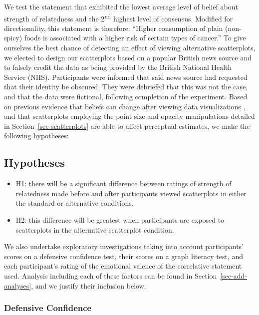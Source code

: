 \documentclass[sigconf]{acmart}
\providecommand{\tightlist}{%
  \setlength{\itemsep}{0pt}\setlength{\parskip}{0pt}}\usepackage{longtable,booktabs,array}
\begin{document}
We test the statement that exhibited the lowest average level of belief
about strength of relatedness and the 2\textsuperscript{nd} highest
level of consensus. Modified for directionality, this statement is
therefore: ``Higher consumption of plain (non-spicy) foods is associated
with a higher risk of certain types of cancer.'' To give ourselves the
best chance of detecting an effect of viewing alternative scatterplots,
we elected to design our scatterplots based on a popular British news
source and to falsely credit the data as being provided by the British
National Health Service (NHS). Participants were informed that said news
source had requested that their identity be obscured. They were
debriefed that this was not the case, and that the data were fictional,
following completion of the experiment. Based on previous evidence that
beliefs can change after viewing data visualizations
\citep{karduni_2020, markant_2023}, and that scatterplots employing the
point size and opacity manipulations detailed in
Section~\ref{sec-scatterplots} are able to affect perceptual estimates,
we make the following hypotheses:

\subsection{Hypotheses}\label{hypotheses}

\begin{itemize}
\tightlist
\item
  H1: there will be a significant difference between ratings of strength
  of relatedness made before and after participants viewed scatterplots
  in either the standard or alternative conditions.
\item
  H2: this difference will be greatest when participants are exposed to
  scatterplots in the alternative scatterplot condition.
\end{itemize}

We also undertake exploratory investigations taking into account
participants' scores on a defensive confidence test, their scores on a
graph literacy test, and each participant's rating of the emotional
valence of the correlative statement used. Analysis including each of
these factors can be found in Section~\ref{sec-add-analyses}, and we
justify their inclusion below.

\subsubsection{Defensive Confidence}\label{sec-def-con}
\end{document}
